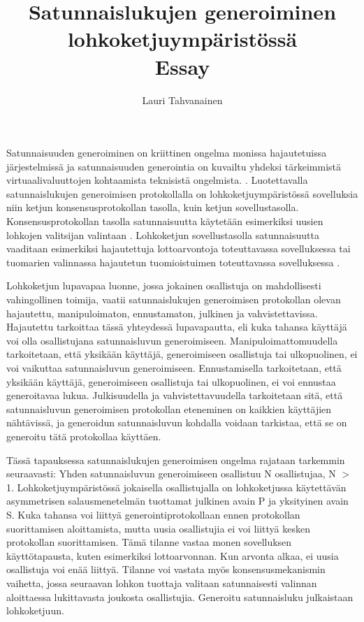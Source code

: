 \documentclass{article}
\title{ Satunnaislukujen generoiminen lohkoketjuympäristössä \\\small{Essay}}
\author{Lauri Tahvanainen}
\begin{document}
\maketitle

Satunnaisuuden generoiminen on kriittinen ongelma monissa hajautetuissa järjestelmissä ja satunnaisuuden generointia on kuvailtu yhdeksi tärkeimmistä virtuaalivaluuttojen kohtaamista teknisistä ongelmista. \cite{noauthor_hpoc_2015_nodate}. Luotettavalla satunnaislukujen generoimisen protokollalla on lohkoketjuympäristössä sovelluksia niin ketjun konsensusprotokollan tasolla, kuin ketjun sovellustasolla. Konsensusprotokollan tasolla satunnaisuutta käytetään esimerkiksi uusien lohkojen valitsijan valintaan \cite{chen_algorand_2017}. Lohkoketjun sovellustasolla satunnaisuutta vaaditaan esimerkiksi hajautettuja lottoarvontoja toteuttavassa sovelluksessa \cite{pooltogether_pooltogether_nodate} tai tuomarien valinnassa hajautetun tuomioistuimen toteuttavassa sovelluksessa \cite{lesaege_kleros_2020}. 

Lohkoketjun lupavapaa luonne, jossa jokainen osallistuja on mahdollisesti vahingollinen toimija, vaatii satunnaislukujen generoimisen protokollan olevan hajautettu, manipuloimaton, ennustamaton, julkinen ja vahvistettavissa. Hajautettu tarkoittaa tässä yhteydessä lupavapautta, eli kuka tahansa käyttäjä voi olla osallistujana satunnaisluvun generoimiseen. Manipuloimattomuudella tarkoitetaan, että yksikään käyttäjä, generoimiseen osallistuja tai ulkopuolinen, ei voi vaikuttaa satunnaisluvun generoimiseen. Ennustamisella tarkoitetaan, että yksikään käyttäjä, generoimiseen osallistuja tai ulkopuolinen, ei voi ennustaa generoitavaa lukua. Julkisuudella ja vahvistettavuudella tarkoitetaan sitä, että satunnaisluvun generoimisen protokollan eteneminen on kaikkien käyttäjien nähtävissä, ja generoidun satunnaisluvun kohdalla voidaan tarkistaa, että se on generoitu tätä protokollaa käyttäen.

Tässä tapauksessa satunnaislukujen generoimisen ongelma rajataan tarkemmin seuraavasti:
Yhden satunnaisluvun generoimiseen osallistuu N osallistujaa,  N $>$ 1. Lohkoketjuympäristössä jokaisella osallistujalla on lohkoketjussa käytettävän asymmetrisen salausmenetelmän tuottamat julkinen avain P ja yksityinen avain S. Kuka tahansa voi liittyä generointiprotokollaan ennen protokollan suorittamisen aloittamista, mutta uusia osallistujia ei voi liittyä kesken protokollan suorittamisen. Tämä tilanne vastaa monen sovelluksen käyttötapausta, kuten esimerkiksi lottoarvonnan. Kun arvonta alkaa, ei uusia osallistuja voi enää liittyä. Tilanne voi vastata myös konsensusmekanismin vaihetta, jossa seuraavan lohkon tuottaja valitaan satunnaisesti valinnan aloittaessa lukittavasta joukosta osallistujia. Generoitu satunnaisluku julkaistaan lohkoketjuun. 
\end{document}

